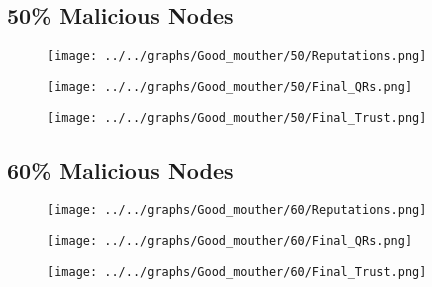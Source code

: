 \begin{minipage}[t]{0.49\columnwidth}
\subsection*{50\% Malicious Nodes}
    \begin{figure}[H]
        \centering
        \texttt{[image: ../../graphs/Good\_mouther/50/Reputations.png]}
    \end{figure}
    \begin{figure}[H]
        \centering
        \texttt{[image: ../../graphs/Good\_mouther/50/Final\_QRs.png]}
    \end{figure}
\end{minipage}
\begin{minipage}[t]{0.49\columnwidth}
    \begin{figure}[H]
        \centering
        \texttt{[image: ../../graphs/Good\_mouther/50/Final\_Trust.png]}
    \end{figure}
\end{minipage}

\begin{minipage}[t]{0.49\columnwidth}
\subsection*{60\% Malicious Nodes}
    \begin{figure}[H]
        \centering
        \texttt{[image: ../../graphs/Good\_mouther/60/Reputations.png]}
    \end{figure}
    \begin{figure}[H]
        \centering
        \texttt{[image: ../../graphs/Good\_mouther/60/Final\_QRs.png]}
    \end{figure}
\end{minipage}
\begin{minipage}[t]{0.49\columnwidth}
    \begin{figure}[H]
        \centering
        \texttt{[image: ../../graphs/Good\_mouther/60/Final\_Trust.png]}
    \end{figure}
\end{minipage}

